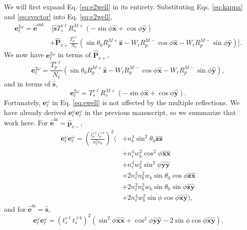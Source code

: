 \documentclass{article}
\begin{document}
We will first expand Eq. \eqref{eq:e2well} in its entirety. Substituting Eqs.
\eqref{eq:kappa} and \eqref{eq:svector} into Eq. \eqref{eq:e2well},
\begin{equation*}\label{eq:e2wexp}
\begin{split}
\mathbf{e}^{2\omega}_{\ell} = \hat{\mathbf{e}}^{\mathrm{out}}&\cdot
\Bigg[
\hat{\mathbf{s}}T_{s}^{v\ell}R^{M+}_{s}
\left(
- \sin\phi\hat{\mathbf{x}}
+ \cos\phi\hat{\mathbf{y}}
\right)\\
&+ \hat{\mathbf{P}}_{v+}\frac{T^{v\ell}_{p}}{N_{\ell}}
\left(
  \sin\theta_{0}R^{M+}_{p}\hat{\mathbf{z}}
- W_{\ell}R^{M-}_{p}\cos\phi\hat{\mathbf{x}}
- W_{\ell}R^{M-}_{p}\sin\phi\hat{\mathbf{y}}
\right)
\Bigg].
\end{split}
\end{equation*}
We  now have $\mathbf{e}^{2\omega}_{\ell}$ in terms of
$\hat{\mathbf{P}}_{v+}$,
\begin{equation}\label{eq:e2wp}
\mathbf{e}^{2\omega}_{\ell} =
\frac{T^{v\ell}_{p}}{N_{\ell}}
\left(
  \sin\theta_{0}R^{M+}_{p}\hat{\mathbf{z}}
- W_{\ell}R^{M-}_{p}\cos\phi\hat{\mathbf{x}}
- W_{\ell}R^{M-}_{p}\sin\phi\hat{\mathbf{y}}
\right),
\end{equation}
and in terms of $\hat{\mathbf{s}}$,
\begin{equation}\label{eq:e2ws}
\mathbf{e}^{2\omega}_{\ell} =
T_{s}^{v\ell}R^{M+}_{s}
\left(
- \sin\phi\hat{\mathbf{x}}
+ \cos\phi\hat{\mathbf{y}}
\right).
\end{equation}
Fortunately, $\mathbf{e}^{\omega}_{\ell}$ in Eq. \eqref{eq:ewell} is not
affected by the multiple reflections. We have already derived
$\mathbf{e}^{\omega}_{\ell}\mathbf{e}^{\omega}_{\ell}$ in the previous
manuscript, so we summarize that work here. For $\hat{\mathbf{e}}^{\mathrm{in}}
= \hat{\mathbf{p}}_{v-}$,
\begin{equation}\label{eq:ewewp}
\begin{split}
\mathbf{e}^{\omega}_{\ell}\mathbf{e}^{\omega}_{\ell}
= \left(\frac{t^{v\ell}_{p}t^{\ell b}_{p}}
{n^{2}_{\ell}n_{b}}\right)^{2}
\big(
&+ n^{4}_{b}\sin^{2}\theta_{0}
   \hat{\mathbf{z}}\hat{\mathbf{z}}\\
&+ n^{4}_{\ell}w^{2}_{b}\cos^{2}\phi
   \hat{\mathbf{x}}\hat{\mathbf{x}}\\
&+ n^{4}_{\ell}w^{2}_{b}\sin^{2}\phi
   \hat{\mathbf{y}}\hat{\mathbf{y}}\\
&+ 2n^{2}_{\ell}n^{2}_{b}w_{b}\sin\theta_{0}\cos\phi
   \hat{\mathbf{z}}\hat{\mathbf{x}}\\
&+ 2n^{2}_{\ell}n^{2}_{b}w_{b}\sin\theta_{0}\sin\phi
   \hat{\mathbf{z}}\hat{\mathbf{y}}\\
&+ 2n^{4}_{\ell}w^{2}_{b}\sin\phi\cos\phi
   \hat{\mathbf{x}}\hat{\mathbf{y}}
\big),
\end{split}
\end{equation}
and for $\hat{\mathbf{e}}^{\mathrm{in}} = \hat{\mathbf{s}}$,
\begin{equation}\label{eq:ewews}
\mathbf{e}^{\omega}_{\ell}\mathbf{e}^{\omega}_{\ell}
= \left(t^{v\ell}_{s}t^{\ell b}_{s}\right)^{2}
\left(
  \sin^{2}\phi\hat{\mathbf{x}}\hat{\mathbf{x}}
+ \cos^{2}\phi\hat{\mathbf{y}}\hat{\mathbf{y}} 
- 2\sin\phi\cos\phi\hat{\mathbf{x}}\hat{\mathbf{y}}
\right).
\end{equation}
\end{document}
